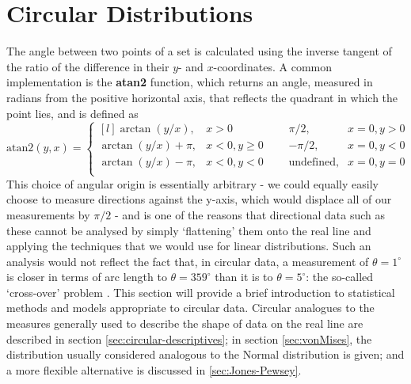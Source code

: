 \documentclass[../../ArchStats.tex]{subfiles}
\begin{document}
\nocite{Jammalamadaka2001}


\section{Circular Distributions}
\label{sec:circular-distributions}

The angle between two points of a set is calculated using the inverse tangent of the ratio of the difference in their $y$- and $x$-coordinates. A common implementation is the \textbf{atan2} function, which returns an angle, measured in radians from the positive horizontal axis, that reflects the quadrant in which the point lies, and is defined as
\begin{equation}
\label{eqn:atan2}
\text{atan2} (y, x) = \left\lbrace \begin{matrix*}[l]
\arctan(y/x), & x > 0 & \, \, \, \, & \pi/2, & x = 0, y > 0 \\
\arctan(y/x) + \pi, & x < 0, y \geq 0 & \, \, \, \, & -\pi/2, & x = 0, y < 0 \\
\arctan(y/x) - \pi, & x < 0, y < 0 & \, \, \, \, & \text{undefined}, & x = 0, y = 0 \\
\end{matrix*} \right. 
\end{equation}
This choice of angular origin is essentially arbitrary - we could equally easily choose to measure directions against the y-axis, which would displace all of our measurements by $\pi/2$ - and is one of the reasons that directional  data such as these cannot be analysed by simply `flattening' them onto the real line and applying the techniques that we would use for linear distributions. Such an analysis would not reflect the fact that, in circular data, a measurement of $\theta = 1^\circ$ is closer in terms of arc length to $\theta = 359^\circ$ than it is to $\theta = 5^\circ$: the so-called `cross-over' problem \cite{Fisher1993}. This section will provide a brief introduction to statistical methods and models appropriate to circular data. Circular analogues to the measures generally used to describe the shape of data on the real line are described in section \ref{sec:circular-descriptives}; in section \ref{sec:vonMises}, the distribution usually considered analogous to the Normal distribution is given; and a more flexible alternative is discussed in \ref{sec:Jones-Pewsey}.
\end{document}
